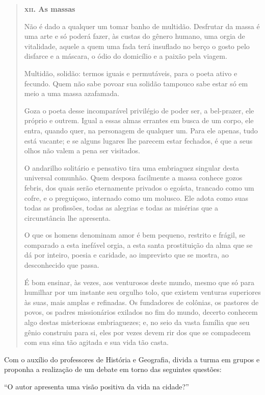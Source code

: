 \documentclass[12pt]{extarticle}
\begin{document}
\begin{quote}
\dotfill

\textbf{\textsc{xii.} As massas}\medskip

Não é dado a qualquer um tomar banho de multidão. Desfrutar da massa é uma
arte e só poderá fazer, às custas do gênero humano, uma orgia de
vitalidade, aquele a quem uma fada terá insuflado no berço o gosto
pelo disfarce e a máscara, o ódio do domicílio e a paixão pela
viagem.

Multidão, solidão: termos iguais e permutáveis, para o poeta ativo e
fecundo. Quem não sabe povoar sua solidão tampouco sabe estar só em
meio a uma massa azafamada.

Goza o poeta desse incomparável privilégio de poder ser, a bel-prazer,
ele próprio e outrem. Igual a essas almas errantes em busca de um corpo,
ele entra, quando quer, na personagem de qualquer um. Para ele apenas, tudo
está vacante; e se alguns lugares lhe parecem estar fechados, é que a
seus olhos não valem a pena ser visitados.

O andarilho solitário e pensativo tira uma embriaguez singular desta
universal comunhão. Quem desposa facilmente a massa conhece gozos
febris, dos quais serão eternamente privados o egoísta, trancado como
um cofre, e o preguiçoso, internado como um molusco. Ele adota como
suas todas as profissões, todas as alegrias e todas as misérias que a
circunstância lhe apresenta.

O que os homens denominam amor é bem pequeno, restrito e frágil, se 
comparado a esta inefável orgia, a esta santa prostituição da alma
que se dá por inteiro, poesia e caridade, ao imprevisto que se mostra, ao
desconhecido que passa.


É bom ensinar, às vezes, aos venturosos deste mundo, mesmo que só para
humilhar por um instante seu orgulho tolo, que existem venturas
superiores às suas, mais amplas e refinadas. Os fundadores de colônias,
os pastores de povos, os padres missionários exilados no fim do mundo,
decerto conhecem algo destas misteriosas embriaguezes; e, no seio da
vasta família que seu gênio construiu para si, eles por vezes devem rir
dos que se compadecem com sua sina tão agitada e sua vida tão
casta.

\dotfill
\end{quote}

Com o auxílio do professores de História e Geografia, divida a turma em grupos e proponha a realização de um debate em torno das seguintes questões: 

``O autor apresenta uma visão positiva da vida na cidade?''
\end{document}
